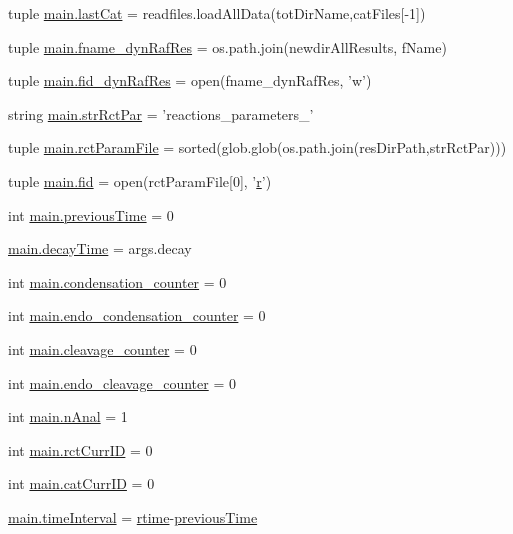 \begin{DoxyCompactItemize}
\item 
tuple \hyperlink{a00111_ad65fb0887c659a9bf884cba677b67272}{main.\-last\-Cat} = readfiles.\-load\-All\-Data(tot\-Dir\-Name,cat\-Files\mbox{[}-\/1\mbox{]})
\item 
tuple \hyperlink{a00111_a6a031fb0c5a0a5519fc4c3f6d7ef35d1}{main.\-fname\-\_\-dyn\-Raf\-Res} = os.\-path.\-join(newdir\-All\-Results, f\-Name)
\item 
tuple \hyperlink{a00111_aaff6b4fb4c2e2089c2a207a12f1757e3}{main.\-fid\-\_\-dyn\-Raf\-Res} = open(fname\-\_\-dyn\-Raf\-Res, 'w')
\item 
string \hyperlink{a00111_af48af84bff2351a55727aba6a63c1b52}{main.\-str\-Rct\-Par} = 'reactions\-\_\-parameters\-\_\-'
\item 
tuple \hyperlink{a00111_ac4e9cba2fd0b813ba19029541ad609e5}{main.\-rct\-Param\-File} = sorted(glob.\-glob(os.\-path.\-join(res\-Dir\-Path,str\-Rct\-Par)))
\item 
tuple \hyperlink{a00111_a68ab0ffa4b5ff1cceff01f4abe686ad0}{main.\-fid} = open(rct\-Param\-File\mbox{[}0\mbox{]}, '\hyperlink{a00025_ac862e7284527eb913b1351c8bfb8e079}{r}')
\item 
int \hyperlink{a00111_a6a6de947e3b6ada5ea6e761d208228bd}{main.\-previous\-Time} = 0
\item 
\hyperlink{a00111_a5517c07ae046c271d6291e9b3f7d139d}{main.\-decay\-Time} = args.\-decay
\item 
int \hyperlink{a00111_a358b60986e7e25df0dfb61562b7aa3e2}{main.\-condensation\-\_\-counter} = 0
\item 
int \hyperlink{a00111_a0521d81d319c4d79433b5fb65a6da1c2}{main.\-endo\-\_\-condensation\-\_\-counter} = 0
\item 
int \hyperlink{a00111_aba28788973ae3e9140b53078efe5d204}{main.\-cleavage\-\_\-counter} = 0
\item 
int \hyperlink{a00111_a17b22b48a2afe0223186b4275fe5ba70}{main.\-endo\-\_\-cleavage\-\_\-counter} = 0
\item 
int \hyperlink{a00111_ae7ca1c378927da05feb71e5a9f775afb}{main.\-n\-Anal} = 1
\item 
int \hyperlink{a00111_a53e397dea15f17442a198395e65b377b}{main.\-rct\-Curr\-I\-D} = 0
\item 
int \hyperlink{a00111_aa56c55225fa65fa569bd8d5f1063550e}{main.\-cat\-Curr\-I\-D} = 0
\item 
\hyperlink{a00111_a5ba0cd0b7538ed8047b2fea322ecb4b7}{main.\-time\-Interval} = \hyperlink{a00022_afc6b38657a313b9f1de2ee356910b6ee}{rtime}-\/\hyperlink{a00022_a17b8652a085b5add031a40fb1c9a680e}{previous\-Time}

\end{DoxyCompactItemize}
